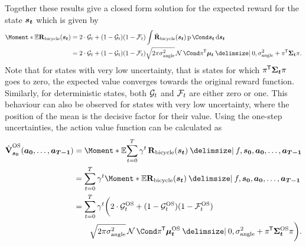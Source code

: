 Together these results give a closed form solution for the expected reward for the state $\bm{s_t}$ which is given by
\begin{align}
    \Moment*{\E}{\RwdBicycle(\rv{s_t})} &= 2 \cdot \PGoal_t + (1 - \PGoal_t)(1 - \PFallen_t) \int \RwdBicycleHat(\rv{s_t}) \Prob{\rv{s_t}} \diff \rv{s_t} \\
    &= 2 \cdot \PGoal_t + (1 - \PGoal_t)(1 - \PFallen_t) \sqrt{2\pi\sigma_{\text{angle}}^2} \Gaussian{\pi\tran \mat{\mu_t} \given 0, \sigma_{\text{angle}}^2 + \pi\tran \mat{\Sigma_t}\pi}.
\end{align}
Note that for states with very low uncertainty, that is states for which $\pi\tran \mat{\Sigma_t} \pi$ goes to zero, the expected value converges towards the original reward function.
Similarly, for deterministic states, both $\mathcal{G}_t$ and $\mathcal{F}_t$ are either zero or one.
This behaviour can also be observed for states with very low uncertainty, where the position of the mean is the decisive factor for their value.
Using the one-step uncertainties, the action value function can be calculated as
\begin{align}
    \label{eq:os_action_value_function}
    \begin{split}
        \os{\AVlu}_{\mat{s_0}}(\mat{a_0}, \dots, \mat{a_{T-1}}) &= \Moment*{\E}{\sum_{t=0}^T \gamma^t \RwdBicycle(\mat{s_t}) \given f, \mat{s_0}, \mat{a_0}, \dots, \mat{a_{T-1}}} \\
        &= \sum_{t=0}^T \gamma^t \Moment*{\E}{\RwdBicycle(\mat{s_t}) \given f, \mat{s_0}, \mat{a_0}, \dots, \mat{a_{T-1}}} \\
        &= \sum_{t=0}^T \gamma^t \bigg( 2 \cdot \os{\PGoal}_t + (1 - \os{\PGoal}_t)(1 - \os{\PFallen}_t) \\
        &\qquad \sqrt{2\pi\sigma_{\text{angle}}^2} \Gaussian{\pi\tran \os{\mat{\mu_t}} \given 0, \sigma_{\text{angle}}^2 + \pi\tran \os{\mat{\Sigma_t}}\pi} \bigg).
    \end{split}
\end{align}

